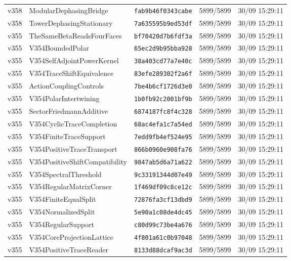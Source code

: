 \documentclass[11pt]{article}
\theoremstyle{definition}\newtheorem{deriv}{Derivation}
\begin{document}
{\begin{longtable}{@{}lllll@{}}
v358 & ModularDephasingBridge & \texttt{fab9b46f0343cabe} & 5899/5899 & 30/09 15:29:11 \\
v358 & TowerDephasingStationary & \texttt{7a635595b9ed53df} & 5899/5899 & 30/09 15:29:11 \\
v355 & TheSameBetaReadsFourFaces & \texttt{bf70420d7b6fdf3a} & 5899/5899 & 30/09 15:29:11 \\
v355 & V354BoundedPolar & \texttt{65ec2d9b95bba928} & 5899/5899 & 30/09 15:29:11 \\
v355 & V354SelfAdjointPowerKernel & \texttt{38a403cd77a7e40c} & 5899/5899 & 30/09 15:29:11 \\
v355 & V354TraceShiftEquivalence & \texttt{83efe289302f2a6f} & 5899/5899 & 30/09 15:29:11 \\
v355 & ActionCouplingControls & \texttt{7be4b6cf1726d3e0} & 5899/5899 & 30/09 15:29:11 \\
v355 & V354PolarIntertwining & \texttt{1b0fb92c2001bf9b} & 5899/5899 & 30/09 15:29:11 \\
v355 & SectorFriedmannAdditive & \texttt{6874187fc8f4c328} & 5899/5899 & 30/09 15:29:11 \\
v355 & V354CyclicTraceCompletion & \texttt{68ac4efa1c7a54ed} & 5899/5899 & 30/09 15:29:11 \\
v355 & V354FiniteTraceSupport & \texttt{7edd9fb4ef524e95} & 5899/5899 & 30/09 15:29:11 \\
v355 & V354PositiveTraceTransport & \texttt{866b0960e908fa76} & 5899/5899 & 30/09 15:29:11 \\
v355 & V354PositiveShiftCompatibility & \texttt{9847ab5d6a71a622} & 5899/5899 & 30/09 15:29:11 \\
v355 & V354SpectralThreshold & \texttt{9c33191344d07e49} & 5899/5899 & 30/09 15:29:11 \\
v355 & V354RegularMatrixCorner & \texttt{1f469df09c8ce12c} & 5899/5899 & 30/09 15:29:11 \\
v355 & V354FiniteEqualSplit & \texttt{72876fa3cf13dbd9} & 5899/5899 & 30/09 15:29:11 \\
v355 & V354NormalizedSplit & \texttt{5e90a1c08de4dc45} & 5899/5899 & 30/09 15:29:11 \\
v355 & V354RegularSupport & \texttt{c80d99c73be4a676} & 5899/5899 & 30/09 15:29:11 \\
v355 & V354CoreProjectionLattice & \texttt{4f801a61c0b97048} & 5899/5899 & 30/09 15:29:11 \\
v355 & V354PositiveTraceReader & \texttt{8133d88dcaf9ac3d} & 5899/5899 & 30/09 15:29:11 \\

\end{longtable}}
\end{document}

